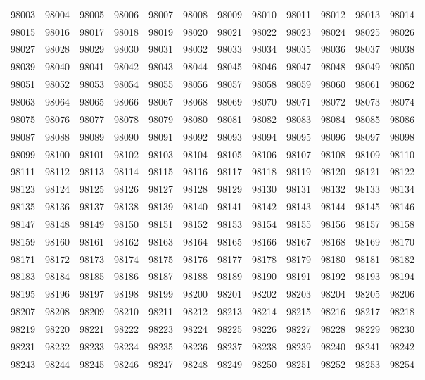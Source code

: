 \begin{center}
\begin{longtable}{llllllllllll}
98003 &98004 &98005 &98006 &98007 &98008 &98009 &98010 &98011 &98012 &98013 &98014 \\
98015 &98016 &98017 &98018 &98019 &98020 &98021 &98022 &98023 &98024 &98025 &98026 \\
98027 &98028 &98029 &98030 &98031 &98032 &98033 &98034 &98035 &98036 &98037 &98038 \\
98039 &98040 &98041 &98042 &98043 &98044 &98045 &98046 &98047 &98048 &98049 &98050 \\
98051 &98052 &98053 &98054 &98055 &98056 &98057 &98058 &98059 &98060 &98061 &98062 \\
98063 &98064 &98065 &98066 &98067 &98068 &98069 &98070 &98071 &98072 &98073 &98074 \\
98075 &98076 &98077 &98078 &98079 &98080 &98081 &98082 &98083 &98084 &98085 &98086 \\
98087 &98088 &98089 &98090 &98091 &98092 &98093 &98094 &98095 &98096 &98097 &98098 \\
98099 &98100 &98101 &98102 &98103 &98104 &98105 &98106 &98107 &98108 &98109 &98110 \\
98111 &98112 &98113 &98114 &98115 &98116 &98117 &98118 &98119 &98120 &98121 &98122 \\
98123 &98124 &98125 &98126 &98127 &98128 &98129 &98130 &98131 &98132 &98133 &98134 \\
98135 &98136 &98137 &98138 &98139 &98140 &98141 &98142 &98143 &98144 &98145 &98146 \\
98147 &98148 &98149 &98150 &98151 &98152 &98153 &98154 &98155 &98156 &98157 &98158 \\
98159 &98160 &98161 &98162 &98163 &98164 &98165 &98166 &98167 &98168 &98169 &98170 \\
98171 &98172 &98173 &98174 &98175 &98176 &98177 &98178 &98179 &98180 &98181 &98182 \\
98183 &98184 &98185 &98186 &98187 &98188 &98189 &98190 &98191 &98192 &98193 &98194 \\
98195 &98196 &98197 &98198 &98199 &98200 &98201 &98202 &98203 &98204 &98205 &98206 \\
98207 &98208 &98209 &98210 &98211 &98212 &98213 &98214 &98215 &98216 &98217 &98218 \\
98219 &98220 &98221 &98222 &98223 &98224 &98225 &98226 &98227 &98228 &98229 &98230 \\
98231 &98232 &98233 &98234 &98235 &98236 &98237 &98238 &98239 &98240 &98241 &98242 \\
98243 &98244 &98245 &98246 &98247 &98248 &98249 &98250 &98251 &98252 &98253 &98254 \\

\end{longtable}
\end{center}
